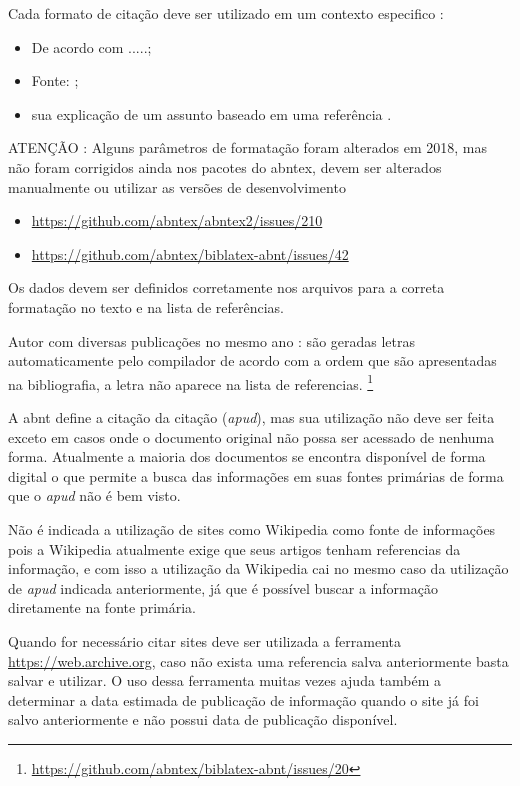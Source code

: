 Cada formato de citação deve ser utilizado em um contexto especifico :
\begin{itemize}
    \item De acordo com  .....;
    
    \item Fonte: ;
    
    \item sua explicação de um assunto baseado em uma referência \cite{SCRUMGUIDE:2013}.
    
\end{itemize}

ATENÇÃO : Alguns parâmetros de formatação foram alterados em 2018, mas não foram corrigidos ainda nos pacotes do \ac{abntex}, devem ser alterados manualmente ou utilizar as versões de desenvolvimento
\begin{itemize}
    \item \url{https://github.com/abntex/abntex2/issues/210}
    
    \item \url{https://github.com/abntex/biblatex-abnt/issues/42}
\end{itemize}

Os dados devem ser definidos corretamente nos arquivos  para a correta formatação no texto e na lista de referências.

Autor com diversas publicações no mesmo ano : são geradas letras automaticamente pelo compilador de acordo com a ordem que são apresentadas na bibliografia, a letra não aparece na lista de referencias. \footnote{\url{https://github.com/abntex/biblatex-abnt/issues/20}}

A \ac{abnt} define a citação da citação (\emph{apud}), mas sua utilização não deve ser feita exceto em casos onde o documento original não possa ser acessado de nenhuma forma. Atualmente a maioria dos documentos se encontra disponível de forma digital o que permite a busca das informações em suas fontes primárias de forma que o \emph{apud} não é bem visto. 

Não é indicada a utilização de sites como Wikipedia como fonte de informações pois a Wikipedia atualmente exige que seus artigos tenham referencias da informação, e com isso a utilização da Wikipedia cai no mesmo caso da utilização de \emph{apud} indicada anteriormente, já que é possível buscar a informação diretamente na fonte primária.

Quando for necessário citar sites deve ser utilizada a ferramenta \url{https://web.archive.org}, caso não exista uma referencia salva anteriormente basta salvar e utilizar. O uso dessa ferramenta muitas vezes ajuda também a determinar a data estimada de publicação de informação quando o site já foi salvo anteriormente e não possui data de publicação disponível.



